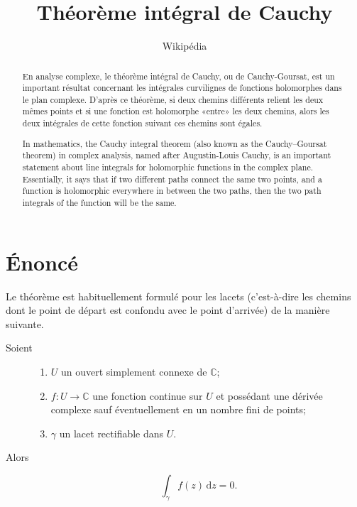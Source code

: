 \documentclass{aomart}
\title{Théorème intégral de Cauchy}
\author{Wikip\'edia}
\begin{document}
{%
\begin{abstract}
  En analyse complexe, le théorème intégral de Cauchy, ou de
  Cauchy-Goursat, est un important résultat concernant les intégrales
  curvilignes de fonctions holomorphes dans le plan complexe. D'après
  ce théorème, si deux chemins différents relient les deux mêmes
  points et si une fonction est holomorphe «entre» les deux chemins,
  alors les deux intégrales de cette fonction suivant ces chemins sont
  égales.
\end{abstract}}

{%
  \begin{abstract}
    In mathematics, the Cauchy integral theorem (also known as the
    Cau\-chy–Gou\-r\-sat theorem) in complex analysis, named after
    Augustin-Louis Cauchy, is an important statement about line
    integrals for holomorphic functions in the complex
    plane. Essentially, it says that if two different paths connect
    the same two points, and a function is holomorphic everywhere in
    between the two paths, then the two path integrals of the function
    will be the same.
  \end{abstract}}

\maketitle

\tableofcontents

\section{Énoncé}

Le théorème est habituellement formulé pour les lacets (c'est-à-dire
les chemins dont le point de départ est confondu avec le point
d'arrivée) de la manière suivante.

\begin{description}
\item[Soient]
  \begin{enumerate}
  \item $U$ un ouvert simplement connexe de $\mathbb{C}$;
  \item $f : U \to \mathbb{C}$ une fonction continue sur $U$ et
    possédant une dérivée complexe sauf éventuellement en un nombre
    fini de points; 
  \item $\gamma$ un lacet rectifiable dans $U$.
  \end{enumerate}

  \item[Alors]
    \begin{displaymath}
      \int _{\gamma }f(z)\,\mathrm {d} z=0.
    \end{displaymath}
  \end{description}
\end{document}
